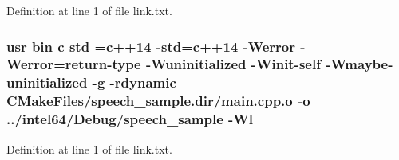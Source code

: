 Definition at line 1 of file link.\+txt.

\subsubsection[{\texorpdfstring{std}{std}}]{\setlength{\rightskip}{0pt plus 5cm}usr bin {\bf c} std ={\bf c}++14 -\/std={\bf c}++14 -\/Werror -\/Werror=return-\/type -\/Wuninitialized -\/Winit-\/self -\/Wmaybe-\/uninitialized -\/g -\/rdynamic C\+Make\+Files/speech\+\_\+sample.\+dir/main.\+cpp.\+o -\/o ../intel64/Debug/speech\+\_\+sample -\/{\bf Wl}}\hypertarget{speech__sample_2CMakeFiles_2speech__sample_8dir_2link_8txt_a1ccfea5f558575a112db71eeb271fabf}{}\label{speech__sample_2CMakeFiles_2speech__sample_8dir_2link_8txt_a1ccfea5f558575a112db71eeb271fabf}


Definition at line 1 of file link.\+txt.

